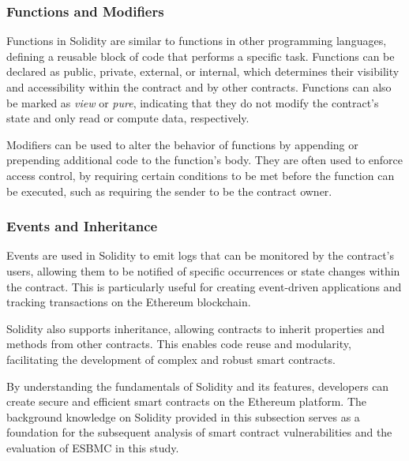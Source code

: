 \subsubsection{Functions and Modifiers}

Functions in Solidity are similar to functions in other programming languages, defining a reusable block of code that performs a specific task. Functions can be declared as public, private, external, or internal, which determines their visibility and accessibility within the contract and by other contracts. Functions can also be marked as \textit{view} or \textit{pure}, indicating that they do not modify the contract's state and only read or compute data, respectively.

Modifiers can be used to alter the behavior of functions by appending or prepending additional code to the function's body. They are often used to enforce access control, by requiring certain conditions to be met before the function can be executed, such as requiring the sender to be the contract owner.

\subsubsection{Events and Inheritance}

Events are used in Solidity to emit logs that can be monitored by the contract's users, allowing them to be notified of specific occurrences or state changes within the contract. This is particularly useful for creating event-driven applications and tracking transactions on the Ethereum blockchain.

Solidity also supports inheritance, allowing contracts to inherit properties and methods from other contracts. This enables code reuse and modularity, facilitating the development of complex and robust smart contracts.

By understanding the fundamentals of Solidity and its features, developers can create secure and efficient smart contracts on the Ethereum platform. The background knowledge on Solidity provided in this subsection serves as a foundation for the subsequent analysis of smart contract vulnerabilities and the evaluation of ESBMC in this study.